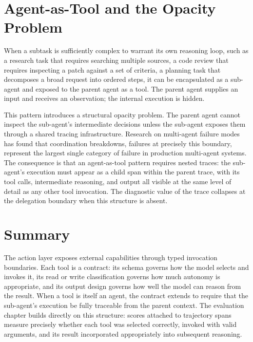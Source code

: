 \section{Agent-as-Tool and the Opacity Problem}

When a subtask is sufficiently complex to warrant its own reasoning loop, such as a research
task that requires searching multiple sources, a code review that requires inspecting a
patch against a set of criteria, a planning task that decomposes a broad request into
ordered steps, it can be encapsulated as a sub-agent and exposed to the parent agent as
a tool. The parent agent supplies an input and receives an observation; the internal
execution is hidden.

This pattern introduces a structural opacity problem. The parent agent cannot inspect
the sub-agent's intermediate decisions unless the sub-agent exposes them through a shared
tracing infrastructure. Research on multi-agent failure modes has found that coordination
breakdowns, failures at precisely this boundary, represent the largest single category
of failure in production multi-agent systems. The consequence is that an agent-as-tool
pattern requires nested traces: the sub-agent's execution must appear as a child span
within the parent trace, with its tool calls, intermediate reasoning, and output all
visible at the same level of detail as any other tool invocation. The diagnostic value
of the trace collapses at the delegation boundary when this structure is absent.

\section{Summary}

The action layer exposes external capabilities through typed invocation boundaries. Each
tool is a contract: its schema governs how the model selects and invokes it, its read or
write classification governs how much autonomy is appropriate, and its output design
governs how well the model can reason from the result. When a tool is itself an agent,
the contract extends to require that the sub-agent's execution be fully traceable from
the parent context. The evaluation chapter builds directly on this structure: scores
attached to trajectory spans measure precisely whether each tool was selected correctly,
invoked with valid arguments, and its result incorporated appropriately into subsequent
reasoning.
